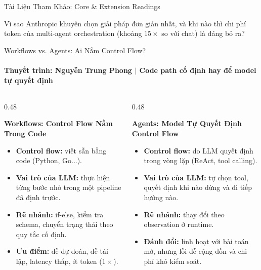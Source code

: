 \documentclass[aspectratio=1610,10pt,xcolor={table}]{beamer}
\begin{document}
\begin{frame}{Tài Liệu Tham Khảo: Core \& Extension Readings}
  \vspace{0.2cm}
  \begin{tcolorbox}[colback=boxbg,colframe=hcmutblue,title={\textbf{Câu Hỏi Trọng Tâm Của Seminar}},fonttitle=\footnotesize\bfseries]
    \footnotesize Vì sao Anthropic khuyên chọn giải pháp đơn giản nhất, và khi nào thì chi phí token của multi-agent orchestration (khoảng $15\times$ so với chat) là đáng bỏ ra?
  \end{tcolorbox}
\end{frame}


\begin{frame}{Workflows vs. Agents: Ai Nắm Control Flow?}
  \framesubtitle{Thuyết trình: Nguyễn Trung Phong $\vert$ Code path cố định hay để model tự quyết định}

  \begin{columns}[t]
    \begin{column}{0.48\textwidth}
      \begin{block}{\textbf{Workflows: Control Flow Nằm Trong Code}}
        \scriptsize
        \begin{itemize}\scriptsize
          \item \textbf{Control flow:} viết sẵn bằng code (Python, Go...).
          \item \textbf{Vai trò của LLM:} thực hiện từng bước nhỏ trong một pipeline đã định trước.
          \item \textbf{Rẽ nhánh:} if-else, kiểm tra schema, chuyển trạng thái theo quy tắc cố định.
          \item \textbf{Ưu điểm:} dễ dự đoán, dễ tái lập, latency thấp, ít token ($1\times$).
        \end{itemize}
      \end{block}
    \end{column}

    \begin{column}{0.48\textwidth}
      \begin{alertblock}{\textbf{Agents: Model Tự Quyết Định Control Flow}}
        \scriptsize
        \begin{itemize}\scriptsize
          \item \textbf{Control flow:} do LLM quyết định trong vòng lặp (ReAct, tool calling).
          \item \textbf{Vai trò của LLM:} tự chọn tool, quyết định khi nào dừng và đi tiếp hướng nào.
          \item \textbf{Rẽ nhánh:} thay đổi theo observation ở runtime.
          \item \textbf{Đánh đổi:} linh hoạt với bài toán mở, nhưng lỗi dễ cộng dồn và chi phí khó kiểm soát.
        \end{itemize}
      \end{alertblock}
    \end{column}
  \end{columns}


\end{frame}
\end{document}
